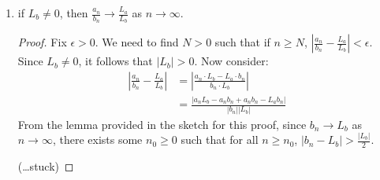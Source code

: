 \documentclass[12pt]{amsart}
\begin{document}
\begin{enumerate}
\begin{enumerate}
\begin{proof}
Because $|c|>0$, we have that $\frac \epsilon {|c|} > 0$.

Since $a_n \to L_a$ as $n\to\infty$, there exists an $N>0$ such that for all $n\ge N$, $|a_n - L_a| < \frac \epsilon {|c|}$. Equivalently, we can say that:
\begin{align*}
\epsilon > |c| \cdot |a_n - L_a| &= |c\cdot(a_n - L_a)| \\
&= |ca_n - cL_a|.
\end{align*}
Hence, for all $n>N$, $|ca_n-cL_a|<\epsilon$, and thus $ca_n \rightarrow cL_a$ as $n\rightarrow \infty$.
\end{proof}

\item if $L_b\neq 0$, then $\displaystyle \frac{a_n}{b_n}\rightarrow
  \frac{L_a}{L_b}$ as $n\rightarrow \infty$.
  \begin{proof}
Fix $\epsilon > 0$.  We need to find $N>0$ such that if $n\ge N$, $|\frac{a_n}{b_n}-\frac{L_a}{L_b}|<\epsilon$.
Since $L_b\not =0$, it follows that $|L_b|>0$.
Now consider:
\begin{align*}
\left|\frac{a_n}{b_n}-\frac{L_a}{L_b}\right| &= \left|\frac{a_n \cdot L_b - L_a \cdot b_n}{b_n \cdot L_b}\right| \\
&= \frac {|a_nL_b - a_nb_n + a_nb_n - L_ab_n|}{|b_n||L_b|}
\end{align*}
From the lemma provided in the sketch for this proof, since $b_n \to L_b$ as $n \to \infty$, there exists some $n_0 \ge 0$ such that for all $n\ge n_0$, $|b_n-L_b| > \frac{|L_b|} 2$.

(\ldots stuck)
\end{proof}
  \end{enumerate}
\end{enumerate}
\end{document}

